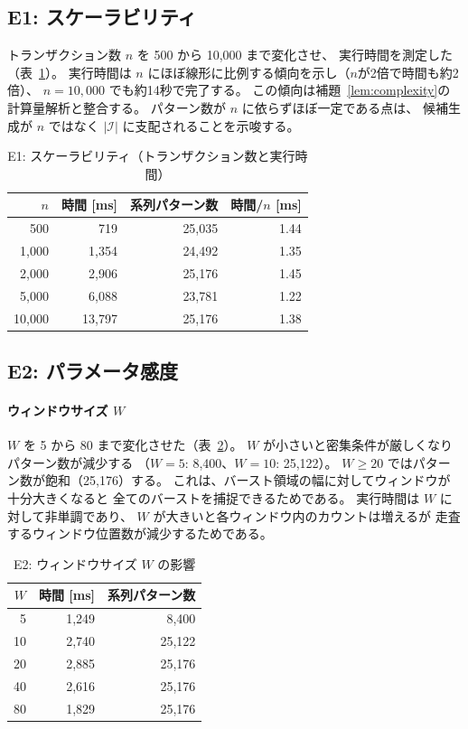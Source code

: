 \documentclass[11pt,a4paper]{article}
\begin{document}
\subsection{E1: スケーラビリティ}

トランザクション数 $n$ を 500 から 10,000 まで変化させ、
実行時間を測定した（表~\ref{tab:scalability}）。
実行時間は $n$ にほぼ線形に比例する傾向を示し（$n$が2倍で時間も約2倍）、
$n = 10{,}000$ でも約14秒で完了する。
この傾向は補題~\ref{lem:complexity}の計算量解析と整合する。
パターン数が $n$ に依らずほぼ一定である点は、
候補生成が $n$ ではなく $|\mathcal{I}|$ に支配されることを示唆する。

\begin{table}[t]
\centering
\caption{E1: スケーラビリティ（トランザクション数と実行時間）}
\label{tab:scalability}
\begin{tabular}{rrrr}
\toprule
$n$ & 時間 [ms] & 系列パターン数 & 時間/$n$ [ms] \\
\midrule
500    &     719 & 25,035 & 1.44 \\
1,000  &   1,354 & 24,492 & 1.35 \\
2,000  &   2,906 & 25,176 & 1.45 \\
5,000  &   6,088 & 23,781 & 1.22 \\
10,000 &  13,797 & 25,176 & 1.38 \\
\bottomrule
\end{tabular}
\end{table}

\subsection{E2: パラメータ感度}

\paragraph{ウィンドウサイズ $W$}
$W$ を 5 から 80 まで変化させた（表~\ref{tab:window}）。
$W$ が小さいと密集条件が厳しくなりパターン数が減少する
（$W=5$: 8,400、$W=10$: 25,122）。
$W \ge 20$ ではパターン数が飽和（25,176）する。
これは、バースト領域の幅に対してウィンドウが十分大きくなると
全てのバーストを捕捉できるためである。
実行時間は $W$ に対して非単調であり、
$W$ が大きいと各ウィンドウ内のカウントは増えるが
走査するウィンドウ位置数が減少するためである。

\begin{table}[t]
\centering
\caption{E2: ウィンドウサイズ $W$ の影響}
\label{tab:window}
\begin{tabular}{rrr}
\toprule
$W$ & 時間 [ms] & 系列パターン数 \\
\midrule
5  & 1,249 & 8,400 \\
10 & 2,740 & 25,122 \\
20 & 2,885 & 25,176 \\
40 & 2,616 & 25,176 \\
80 & 1,829 & 25,176 \\
\bottomrule
\end{tabular}
\end{table}
\end{document}
